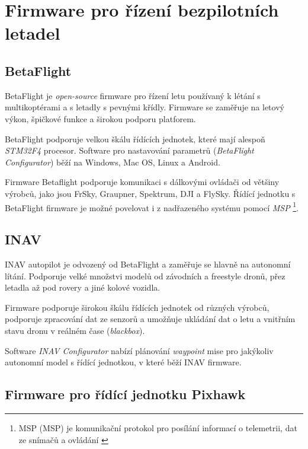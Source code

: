 \chapter{Firmware pro řízení bezpilotních letadel}

\section{BetaFlight}

BetaFlight je \textit{open-source} firmware pro řízení letu používaný k létání s multikoptérami a s letadly s pevnými křídly. Firmware se zaměřuje na letový výkon, špičkové funkce a širokou podporu platforem.

BetaFlight podporuje velkou škálu řídících jednotek, které mají alespoň \textit{STM32F4} procesor. Software pro nastavování parametrů (\textit{BetaFlight Configurator}) běží na Windows, Mac OS, Linux a Android.

Firmware Betaflight podporuje komunikaci s dálkovými ovládači od většiny výrobců, jako jsou FrSky, Graupner, Spektrum, DJI a FlySky. Řídící jednotku s BetaFlight firmware je možné povelovat i z nadřazeného systému pomocí \textit{\acs{MSP}} \footnote{\acs{MSP} (\acl{MSP}) je komunikační protokol pro posílání informací o telemetrii, dat ze snímačů a ovládání \cite{ARDU}}. \cite{BetaF}

\section{INAV}

INAV autopilot je odvozený od BetaFlight a zaměřuje se hlavně na autonomní lítání. Podporuje velké množstvi modelů od závodních a freestyle dronů, přez letadla až pod rovery a jiné kolové vozidla.

Firmware podporuje širokou škálu řídících jednotek od různých výrobců, podporuje zpracování dat ze senzorů a umožňuje ukládání dat o letu a vnitřním stavu dronu v reálném čase (\textit{blackbox}). \cite{INAV}

Software\textbf{} \textit{INAV Configurator} nabízí plánování \textit{waypoint} mise pro jakýkoliv autonomní model s řídící jednotkou, v které běží INAV firmware.

\section{Firmware pro řídící jednotku Pixhawk}

